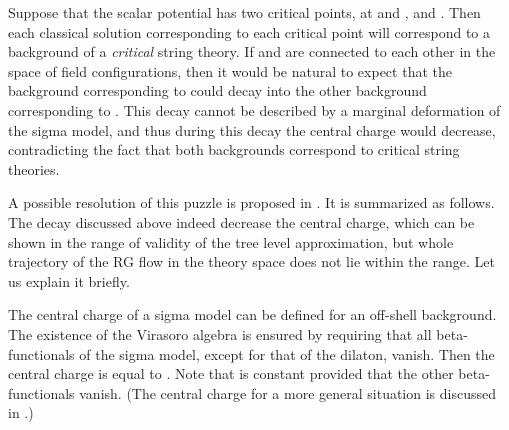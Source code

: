 \documentclass[a4paper,a4paper]{article}
\begin{document}
Suppose that the scalar potential \coordHE{} has two critical points, at \coordHE{} and 
\coordHE{}, and \coordHE{}. 
Then each classical solution corresponding to each critical point will correspond to a background of 
a {\it critical} string theory. 
If \coordHE{} and \coordHE{} are connected to each other in the space of field configurations, 
then it would be natural to expect 
that the background corresponding to \coordHE{} could decay into the other background corresponding to 
\coordHE{}. 
This decay cannot be described by a marginal deformation of the sigma model, and thus during this decay the 
central charge would decrease, contradicting the fact that both backgrounds correspond to critical string 
theories. 

\vspace{3mm}

A possible resolution of this puzzle is proposed in \cite{suyama}. 
It is summarized as follows. 
The decay discussed above indeed decrease the central charge, which can be shown in the range of validity of the 
tree level approximation, but whole trajectory of the RG flow in the theory space does not lie within the range. 
Let us explain it briefly. 

The central charge of a sigma model can be defined for an off-shell background. 
The existence of the Virasoro algebra is ensured by requiring that all beta-functionals of the sigma model, 
except for that \myHighlight{$\beta_{\Phi}$}\coordHE{} of the dilaton, vanish. 
Then the central charge is equal to \myHighlight{$\beta_{\Phi}$}\coordHE{}. 
Note that \myHighlight{$\beta_{\Phi}$}\coordHE{} is constant provided that the other beta-functionals vanish. 
(The central charge for a more general situation is discussed in \cite{Tseytlin}.) 
\end{document}
